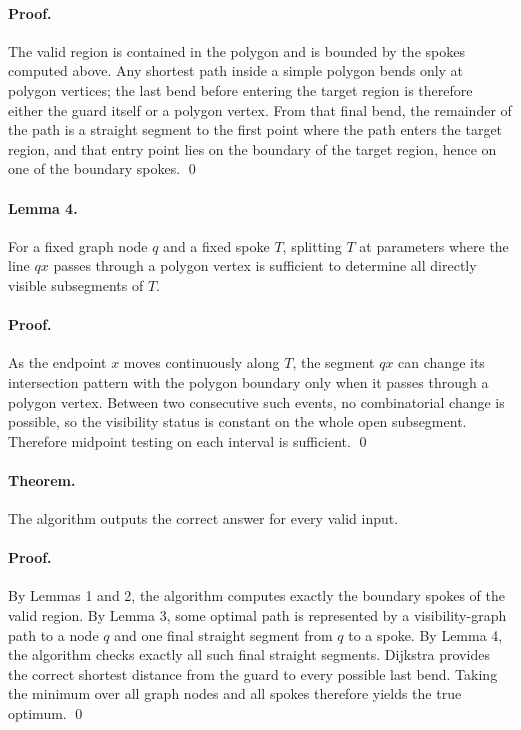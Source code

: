 \documentclass[11pt]{article}
\begin{document}
\paragraph{Proof.}
The valid region is contained in the polygon and is bounded by the spokes computed above. Any shortest
path inside a simple polygon bends only at polygon vertices; the last bend before entering the target
region is therefore either the guard itself or a polygon vertex. From that final bend, the remainder of the
path is a straight segment to the first point where the path enters the target region, and that entry point
lies on the boundary of the target region, hence on one of the boundary spokes. \qed

\paragraph{Lemma 4.}
For a fixed graph node $q$ and a fixed spoke $T$, splitting $T$ at parameters where the line $qx$ passes
through a polygon vertex is sufficient to determine all directly visible subsegments of $T$.

\paragraph{Proof.}
As the endpoint $x$ moves continuously along $T$, the segment $qx$ can change its intersection pattern
with the polygon boundary only when it passes through a polygon vertex. Between two consecutive such
events, no combinatorial change is possible, so the visibility status is constant on the whole open
subsegment. Therefore midpoint testing on each interval is sufficient. \qed

\paragraph{Theorem.}
The algorithm outputs the correct answer for every valid input.

\paragraph{Proof.}
By Lemmas 1 and 2, the algorithm computes exactly the boundary spokes of the valid region.
By Lemma 3, some optimal path is represented by a visibility-graph path to a node $q$ and one final
straight segment from $q$ to a spoke. By Lemma 4, the algorithm checks exactly all such final straight
segments. Dijkstra provides the correct shortest distance from the guard to every possible last bend.
Taking the minimum over all graph nodes and all spokes therefore yields the true optimum. \qed
\end{document}
